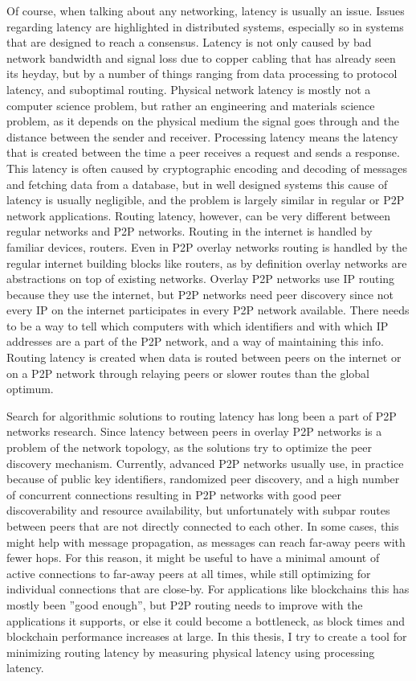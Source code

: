 Of course, when talking about any networking, latency is usually an issue. Issues regarding latency are highlighted in distributed systems, especially so in systems that are designed to reach a consensus. Latency is not only caused by bad network bandwidth and signal loss due to copper cabling that has already seen its heyday, but by a number of things ranging from data processing to protocol latency, and suboptimal routing. Physical network latency is mostly not a computer science problem, but rather an engineering and materials science problem, as it depends on the physical medium the signal goes through and the distance between the sender and receiver. Processing latency means the latency that is created between the time a peer receives a request and sends a response. This latency is often caused by cryptographic encoding and decoding of messages and fetching data from a database, but in well designed systems this cause of latency is usually negligible, and the problem is largely similar in regular or P2P network applications. Routing latency, however, can be very different between regular networks and P2P networks. Routing in the internet is handled by familiar devices, routers. Even in P2P overlay networks routing is handled by the regular internet building blocks like routers, as by definition overlay networks are abstractions on top of existing networks. Overlay P2P networks use IP routing because they use the internet, but P2P networks need peer discovery since not every IP on the internet participates in every P2P network available. There needs to be a way to tell which computers with which identifiers and with which IP addresses are a part of the P2P network, and a way of maintaining this info. Routing latency is created when data is routed between peers on the internet or on a P2P network through relaying peers or slower routes than the global optimum.

Search for algorithmic solutions to routing latency has long been a part of P2P networks research. Since latency between peers in overlay P2P networks is a problem of the network topology, as  the solutions try to optimize the peer discovery mechanism. Currently, advanced P2P networks usually use, in practice because of public key identifiers, randomized peer discovery, and a high number of concurrent connections resulting in P2P networks with good peer discoverability and resource availability, but unfortunately with subpar routes between peers that are not directly connected to each other. In some cases, this might help with message propagation, as messages can reach far-away peers with fewer hops. For this reason, it might be useful to have a minimal amount of active connections to far-away peers at all times, while still optimizing for individual connections that are close-by. For applications like blockchains this has mostly been ''good enough'', but P2P routing needs to improve with the applications it supports, or else it could become a bottleneck, as block times and blockchain performance increases at large. In this thesis, I try to create a tool for minimizing routing latency by measuring physical latency using processing latency.

